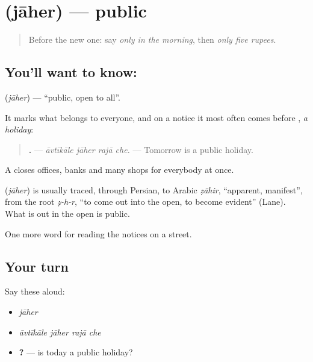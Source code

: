 \section[\texorpdfstring{\gu{જાહેર} (jāher)}{જાહેર (jāher)}]{ (jāher) — public}

\label{lesson:GU-C151-jaher}



\begin{quote}
Before the new one: say \emph{only in the morning}, then \emph{only five rupees}.
\end{quote}

\subsection*{You'll want to know: }
\textbf{} (\emph{jāher}) — \textquotedblleft{}public, open to all\textquotedblright{}.

It marks what belongs to everyone, and on a notice it most often comes before \textbf{}, \emph{a holiday}:

\begin{quote}
\textbf{   .} — \emph{āvtīkāle jāher rajā che.} — Tomorrow is a public holiday.
\end{quote}

A \textbf{ } closes offices, banks and many shops for everybody at once.

\begin{cousinweb}
\textbf{} (\emph{jāher}) is usually traced, through Persian, to Arabic \emph{ẓāhir}, \textquotedblleft{}apparent, manifest\textquotedblright{}, from the root \emph{ẓ-h-r}, \textquotedblleft{}to come out into the open, to become evident\textquotedblright{} (Lane). What is out in the open is public.
\end{cousinweb}

\begin{grammarlens}[title={What you've built}]
One more word for reading the notices on a street.
\end{grammarlens}

\subsection*{Your turn}
Say these aloud:

\begin{itemize}
\raggedright
  \item \emph{jāher}
  \item \emph{āvtīkāle jāher rajā che}
  \item \textbf{    ?} — is today a public holiday?
\end{itemize}

